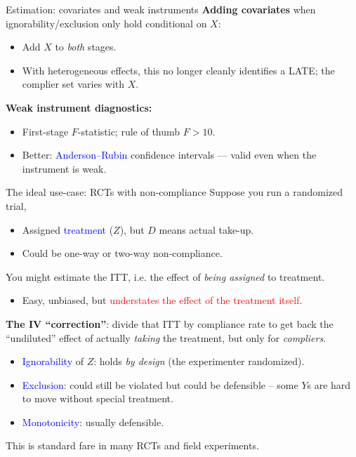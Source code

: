\documentclass[xcolor=dvipsnames]{beamer}
\begin{document}
\begin{frame}{Estimation: covariates and weak instruments}
\small
\textbf{Adding covariates} when ignorability/exclusion only hold conditional on $X$:
\begin{itemize}
\item Add $X$ to \textit{both} stages.
\item With heterogeneous effects, this no longer cleanly identifies a LATE; the complier set varies with $X$. %
\end{itemize}
\bigskip

\textbf{Weak instrument diagnostics:}
\begin{itemize}
\item First-stage $F$-statistic; rule of thumb $F>10$.
\item Better: \textcolor{Blue}{Anderson--Rubin} confidence intervals --- valid even when the instrument is weak.
\end{itemize}
\end{frame}

\begin{frame}{The ideal use-case: RCTs with non-compliance}
 Suppose you run a randomized trial, \\
\small
\begin{itemize}
\item Assigned \textcolor{Blue}{treatment} ($Z$), but $D$ means actual take-up.
\item Could be one-way or two-way non-compliance.
\end{itemize}
\bigskip

 You might estimate the ITT, i.e. the effect of \textit{being assigned} to treatment. 
\begin{itemize}
\item<3-> Easy, unbiased, but \textcolor{Red}{understates the effect of the treatment itself}.
\end{itemize}

\bigskip
{} \textbf{The IV ``correction''}: divide that ITT by compliance rate to get back the ``undiluted'' effect of actually \textit{taking} the treatment, but only for \textit{compliers}.
\medskip
\begin{itemize}\footnotesize
\item \textcolor{Blue}{Ignorability} of $Z$: holds \textit{by design} (the experimenter randomized).
\item \textcolor{Blue}{Exclusion}: could still be violated but could be defensible -- some $Y$s are hard to move without special treatment.
\item \textcolor{Blue}{Monotonicity}: usually defensible.
\end{itemize}

\medskip
{} This is standard fare in many RCTs and field experiments.
\end{frame}
\end{document}
